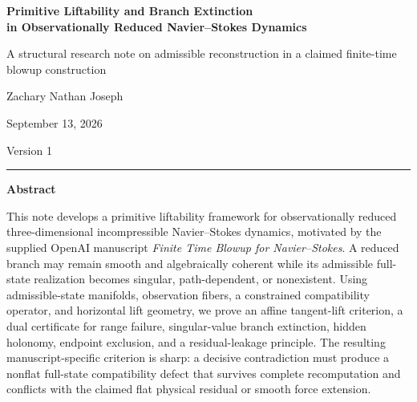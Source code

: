\documentclass[12pt]{article}
\begin{document}
\begin{titlepage}
\thispagestyle{empty}
\begin{center}
\vspace*{0.72in}
{\LARGE\bfseries Primitive Liftability and Branch Extinction\\[0.15in]
 in Observationally Reduced Navier--Stokes Dynamics\par}
\vspace{0.22in}
{\large A structural research note on admissible reconstruction in a claimed finite-time blowup construction\par}
\vspace{0.48in}
{\large Zachary Nathan Joseph\par}
\vspace{0.07in}
{\normalsize September 13, 2026\par}
\vspace{0.08in}
{\normalsize Version 1\par}
\vspace{0.46in}
\rule{0.82\textwidth}{0.4pt}
\end{center}

\vspace{0.30in}
\begin{center}
\begin{minipage}{0.88\textwidth}
\begin{center}
{\normalsize\bfseries Abstract}
\end{center}
\small
This note develops a primitive liftability framework for observationally reduced three-dimensional incompressible Navier--Stokes dynamics, motivated by the supplied OpenAI manuscript \emph{Finite Time Blowup for Navier--Stokes}. A reduced branch may remain smooth and algebraically coherent while its admissible full-state realization becomes singular, path-dependent, or nonexistent. Using admissible-state manifolds, observation fibers, a constrained compatibility operator, and horizontal lift geometry, we prove an affine tangent-lift criterion, a dual certificate for range failure, singular-value branch extinction, hidden holonomy, endpoint exclusion, and a residual-leakage principle. The resulting manuscript-specific criterion is sharp: a decisive contradiction must produce a nonflat full-state compatibility defect that survives complete recomputation and conflicts with the claimed flat physical residual or smooth force extension.
\end{minipage}
\end{center}
\vfill
\end{titlepage}
\setcounter{page}{2}
\end{document}
